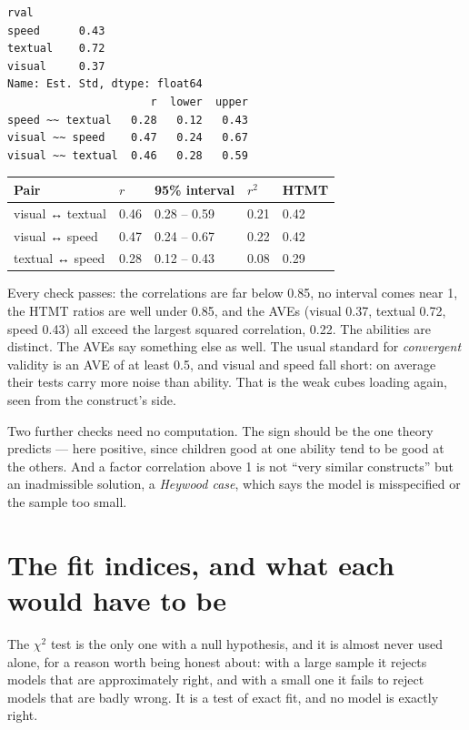 \documentclass[
  letterpaper,
  10pt,
  twoside,
  openright,
  numbers=noenddot,
  chapterprefix=true]{scrbook}
\begin{document}
\begin{verbatim}
rval
speed      0.43
textual    0.72
visual     0.37
Name: Est. Std, dtype: float64
                      r  lower  upper
speed ~~ textual   0.28   0.12   0.43
visual ~~ speed    0.47   0.24   0.67
visual ~~ textual  0.46   0.28   0.59
\end{verbatim}

\begin{longtable}[]{@{}lllll@{}}
\toprule\noalign{}
Pair & \(r\) & 95\% interval & \(r^2\) & HTMT \\
\midrule\noalign{}
\endhead
\bottomrule\noalign{}
\endlastfoot
visual ↔ textual & 0.46 & 0.28 -- 0.59 & 0.21 & 0.42 \\
visual ↔ speed & 0.47 & 0.24 -- 0.67 & 0.22 & 0.42 \\
textual ↔ speed & 0.28 & 0.12 -- 0.43 & 0.08 & 0.29 \\
\end{longtable}

Every check passes: the correlations are far below 0.85, no interval
comes near 1, the HTMT ratios are well under 0.85, and the AVEs (visual
0.37, textual 0.72, speed 0.43) all exceed the largest squared
correlation, 0.22. The abilities are distinct. The AVEs say something
else as well. The usual standard for \emph{convergent} validity is an
AVE of at least 0.5, and visual and speed fall short: on average their
tests carry more noise than ability. That is the weak cubes loading
again, seen from the construct's side.

Two further checks need no computation. The sign should be the one
theory predicts --- here positive, since children good at one ability
tend to be good at the others. And a factor correlation above 1 is not
``very similar constructs'' but an inadmissible solution, a
\emph{Heywood case}, which says the model is misspecified or the sample
too small.

\section{The fit indices, and what each would have to
be}\label{the-fit-indices-and-what-each-would-have-to-be}

The \(\chi^2\) test is the only one with a null hypothesis, and it is
almost never used alone, for a reason worth being honest about: with a
large sample it rejects models that are approximately right, and with a
small one it fails to reject models that are badly wrong. It is a test
of exact fit, and no model is exactly right.
\end{document}
